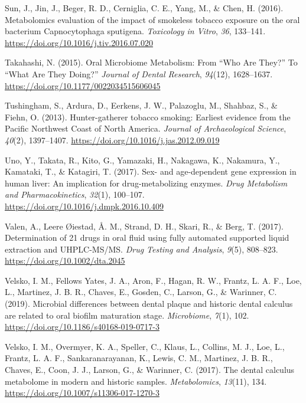 \documentclass[
]{article}
\newlength{\cslhangindent}
\newlength{\cslentryspacingunit} %
\newenvironment{CSLReferences}[2] %
 {%
  \setlength{\parindent}{0pt}
  \ifodd #1
  \let\oldpar\par
  \def\par{\hangindent=\cslhangindent\oldpar}
  \fi
  \setlength{\parskip}{#2\cslentryspacingunit}
 }%
 {}
\begin{document}
\begin{CSLReferences}{1}{0}
\leavevmode{}%
Sun, J., Jin, J., Beger, R. D., Cerniglia, C. E., Yang, M., \& Chen, H.
(2016). Metabolomics evaluation of the impact of smokeless tobacco
exposure on the oral bacterium {Capnocytophaga} sputigena.
\emph{Toxicology in Vitro}, \emph{36}, 133--141.
\url{https://doi.org/10.1016/j.tiv.2016.07.020}

\leavevmode{}%
Takahashi, N. (2015). Oral {Microbiome Metabolism}: {From} {``{Who Are
They}?''} To {``{What Are They Doing}?''} \emph{Journal of Dental
Research}, \emph{94}(12), 1628--1637.
\url{https://doi.org/10.1177/0022034515606045}

\leavevmode{}%
Tushingham, S., Ardura, D., Eerkens, J. W., Palazoglu, M., Shahbaz, S.,
\& Fiehn, O. (2013). Hunter-gatherer tobacco smoking: Earliest evidence
from the {Pacific Northwest Coast} of {North America}. \emph{Journal of
Archaeological Science}, \emph{40}(2), 1397--1407.
\url{https://doi.org/10.1016/j.jas.2012.09.019}

\leavevmode{}%
Uno, Y., Takata, R., Kito, G., Yamazaki, H., Nakagawa, K., Nakamura, Y.,
Kamataki, T., \& Katagiri, T. (2017). Sex- and age-dependent gene
expression in human liver: {An} implication for drug-metabolizing
enzymes. \emph{Drug Metabolism and Pharmacokinetics}, \emph{32}(1),
100--107. \url{https://doi.org/10.1016/j.dmpk.2016.10.409}

\leavevmode{}%
Valen, A., Leere Øiestad, Å. M., Strand, D. H., Skari, R., \& Berg, T.
(2017). Determination of 21 drugs in oral fluid using fully automated
supported liquid extraction and {UHPLC-MS}/{MS}. \emph{Drug Testing and
Analysis}, \emph{9}(5), 808--823. \url{https://doi.org/10.1002/dta.2045}

\leavevmode{}%
Velsko, I. M., Fellows Yates, J. A., Aron, F., Hagan, R. W., Frantz, L.
A. F., Loe, L., Martinez, J. B. R., Chaves, E., Gosden, C., Larson, G.,
\& Warinner, C. (2019). Microbial differences between dental plaque and
historic dental calculus are related to oral biofilm maturation stage.
\emph{Microbiome}, \emph{7}(1), 102.
\url{https://doi.org/10.1186/s40168-019-0717-3}

\leavevmode{}%
Velsko, I. M., Overmyer, K. A., Speller, C., Klaus, L., Collins, M. J.,
Loe, L., Frantz, L. A. F., Sankaranarayanan, K., Lewis, C. M., Martinez,
J. B. R., Chaves, E., Coon, J. J., Larson, G., \& Warinner, C. (2017).
The dental calculus metabolome in modern and historic samples.
\emph{Metabolomics}, \emph{13}(11), 134.
\url{https://doi.org/10.1007/s11306-017-1270-3}


\end{CSLReferences}
\end{document}
